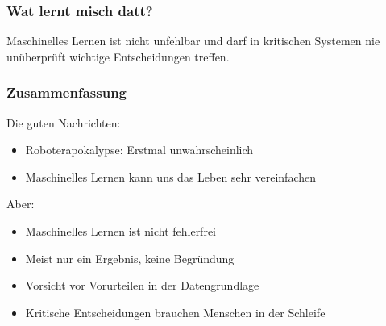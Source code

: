 \documentclass[aspectratio=169,x11names]{beamer}
\begin{document}
\begin{frame}
\frametitle{Wat lernt misch datt?}
\begin{center}
\color{red}
\large
Maschinelles Lernen ist nicht unfehlbar und darf in kritischen Systemen nie 
unüberprüft wichtige Entscheidungen treffen.
\end{center}
\end{frame}







\begin{frame}
\frametitle{Zusammenfassung}

Die guten Nachrichten:

\begin{itemize}
\color{Green4}
\pause\item Roboterapokalypse: Erstmal unwahrscheinlich
\pause\item Maschinelles Lernen kann uns das Leben sehr vereinfachen
\end{itemize}
\bigskip

Aber:

\begin{itemize}
\color{Firebrick1}
\pause\item Maschinelles Lernen ist nicht fehlerfrei
\pause\item Meist nur ein Ergebnis, keine Begründung
\pause\item Vorsicht vor Vorurteilen in der Datengrundlage
\pause\item Kritische Entscheidungen brauchen Menschen in der Schleife
\end{itemize}

\end{frame}
\end{document}
